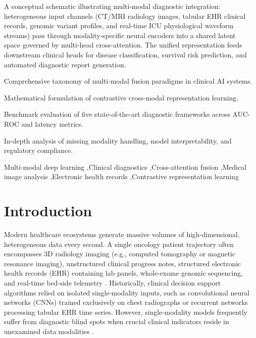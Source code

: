 \documentclass[final,3p,times]{elsarticle}
\begin{document}
\begin{frontmatter}
\begin{graphicalabstract}
A conceptual schematic illustrating multi-modal diagnostic integration: heterogeneous input channels (CT/MRI radiology images, tabular EHR clinical records, genomic variant profiles, and real-time ICU physiological waveform streams) pass through modality-specific neural encoders into a shared latent space governed by multi-head cross-attention. The unified representation feeds downstream clinical heads for disease classification, survival risk prediction, and automated diagnostic report generation.
\end{graphicalabstract}

\begin{highlights}
\item Comprehensive taxonomy of multi-modal fusion paradigms in clinical AI systems.
\item Mathematical formulation of contrastive cross-modal representation learning.
\item Benchmark evaluation of five state-of-the-art diagnostic frameworks across AUC-ROC and latency metrics.
\item In-depth analysis of missing modality handling, model interpretability, and regulatory compliance.
\end{highlights}

\begin{keyword}
Multi-modal deep learning \sep Clinical diagnostics \sep Cross-attention fusion \sep Medical image analysis \sep Electronic health records \sep Contrastive representation learning
\end{keyword}

\end{frontmatter}

\linenumbers

\section{Introduction}
\label{sec:intro}
Modern healthcare ecosystems generate massive volumes of high-dimensional, heterogeneous data every second. A single oncology patient trajectory often encompasses 3D radiology imaging (e.g., computed tomography or magnetic resonance imaging), unstructured clinical progress notes, structured electronic health records (EHR) containing lab panels, whole-exome genomic sequencing, and real-time bed-side telemetry \cite{rostova2023multimodal, vance2024clinical}. Historically, clinical decision support algorithms relied on isolated single-modality inputs, such as convolutional neural networks (CNNs) trained exclusively on chest radiographs or recurrent networks processing tabular EHR time series. However, single-modality models frequently suffer from diagnostic blind spots when crucial clinical indicators reside in unexamined data modalities \cite{jenkins2024crossmodal}.
\end{document}
